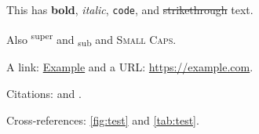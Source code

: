 This has \textbf{bold}, \emph{italic}, \texttt{code}, and \sout{strikethrough} text.

Also \textsuperscript{super} and \textsubscript{sub} and \textsc{Small Caps}.

A link: \href{https://example.com}{Example} and a URL: \url{https://example.com}.

Citations: \cite{smith2020} and \citet{jones2021}.

Cross-references: \ref{fig:test} and \autoref{tab:test}.
